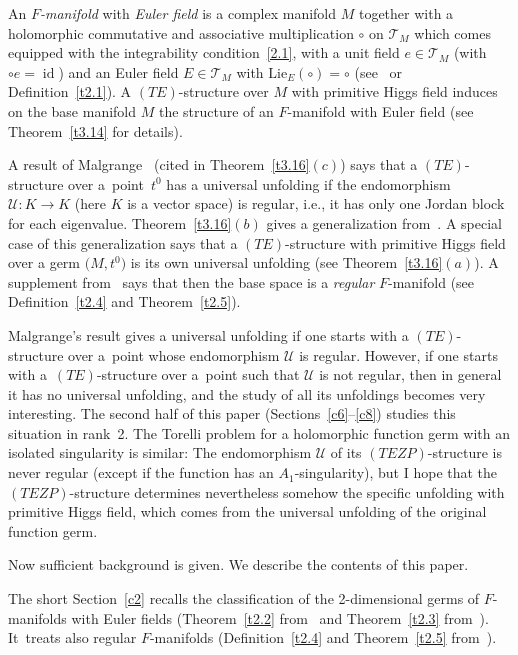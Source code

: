 \documentclass[pdftex]{sigma}%
\numberwithin{equation}{section}
\numberwithin{figure}{section}
\newcommand{\TT}{{\mathcal T}}
\newcommand{\UU}{{\mathcal U}}
\DeclareMathOperator{\id}{id}
\begin{document}
An {\it $F$-manifold} with {\it Euler field}
is a complex manifold $M$
together with a holomorphic commutative and associative
multiplication $\circ$ on $\TT_M$ which comes equipped
with the integrability condition~\eqref{2.1},
with a unit field $e\in\TT_M$ (with $\circ e=\id$)
and an Euler field $E\in\TT_M$
with $\text{Lie}_E(\circ)=\circ$
(see~\cite{HM99} or Definition~\ref{t2.1}).
A $(TE)$-structure over $M$ with
primitive Higgs field indu\-ces on the base manifold $M$ the
structure of an $F$-manifold with Euler field
(see Theorem~\ref{t3.14} for details).

A result of Malgrange~\cite{Ma86} (cited in
Theorem~\ref{t3.16}$(c)$) says that a $(TE)$-structure
over a~point~$t^0$ has a universal unfolding if the
endomorphism $\UU\colon K\to K$ (here $K$ is a vector space)
is regular, i.e., it has only one Jordan block for each
eigenvalue. Theorem~\ref{t3.16}$(b)$ gives a generalization
from~\cite{HM04}. A special case of this generalization
says that a $(TE)$-structure with primitive
Higgs field over a germ $\big(M,t^0\big)$ is its own universal
unfolding (see Theorem~\ref{t3.16}$(a)$).
A supplement from~\cite{DH17} says that then the base space
is a {\it regular} $F$-manifold (see Definition~\ref{t2.4}
and Theorem~\ref{t2.5}).

Malgrange's result gives a universal unfolding
if one starts with a $(TE)$-structure over a~point
whose endomorphism $\UU$ is regular.
However, if one starts with a~$(TE)$-structure over a~point such that $\UU$ is not regular, then in general it
has no universal unfolding, and the study of all its
unfoldings becomes very interesting. The second half of
this paper (Sections~\ref{c6}--\ref{c8}) studies
this situation in rank~2. The Torelli problem for a
holomorphic function germ with an isolated singularity
is similar: The endomorphism
$\UU$ of its $(TEZP)$-structure is never regular
(except if the function has an $A_1$-singularity),
but I hope that the $(TEZP)$-structure
determines nevertheless somehow the specific
unfolding with primitive Higgs field, which comes from the
universal unfolding of the original function germ.

Now sufficient background is given.
We describe the contents of this paper.

The short Section~\ref{c2} recalls the classification of the
2-dimensional germs of $F$-manifolds with Euler fields
(Theorem~\ref{t2.2} from~\cite{He02} and Theorem~\ref{t2.3}
from~\cite{DH20-3}). It~treats also regular $F$-manifolds
(Definition~\ref{t2.4} and Theorem~\ref{t2.5} from~\cite{DH17}).
\end{document}
